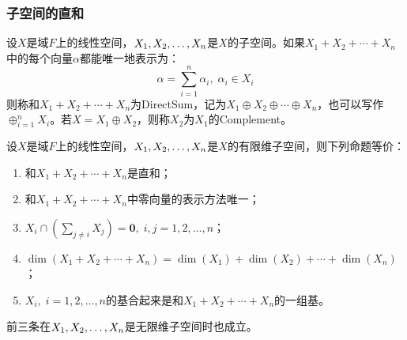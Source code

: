 \subsubsection{子空间的直和}
\begin{definition}
	设$X$是域$F$上的线性空间，$X_1, X_2, \dots, X_{n}$是$X$的子空间。如果$X_1+X_2+\cdots+X_n$中的每个向量$\alpha$都能唯一地表示为：
	\begin{equation*}
		\alpha=\sum_{i=1}^{n}\alpha_i,\;\alpha_i\in X_i
	\end{equation*}
	则称和$X_1+X_2+\cdots+X_n$为\gls{DirectSum}，记为$X_1\oplus X_2\oplus\cdots\oplus X_n$，也可以写作$\oplus_{i=1}^nX_i$。若$X=X_1\oplus X_2$，则称$X_2$为$X_1$的\gls{Complement}。
\end{definition}
\begin{theorem}\label{theo:DirectSum}
	设$X$是域$F$上的线性空间，$X_1, X_2, \dots, X_{n}$是$X$的有限维子空间，则下列命题等价：
	\begin{enumerate}
		\item 和$X_1+X_2+\cdots+X_n$是直和；
		\item 和$X_1+X_2+\cdots+X_n$中零向量的表示方法唯一；
		\item $X_i\cap\left(\sum\limits_{j\ne i}X_j\right)=\mathbf{0},\;i,j=1,2,\dots,n$；
		\item $\dim(X_1+X_2+\cdots+X_n)=\dim(X_1)+\dim(X_2)+\cdots+\dim(X_n)$；
		\item $X_i,\;i=1,2,\dots,n$的基合起来是和$X_1+X_2+\cdots+X_n$的一组基。
	\end{enumerate}
	前三条在$X_1, X_2, \dots, X_{n}$是无限维子空间时也成立。
\end{theorem}
